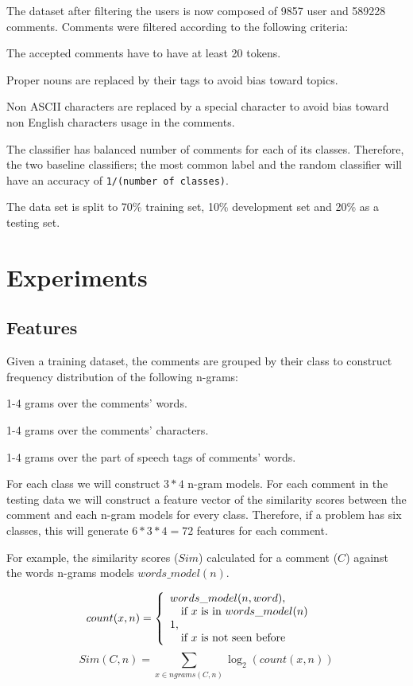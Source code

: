 \documentclass[10pt,a5paper,twoside]{article}
\begin{document}
The dataset after filtering the users is now composed of 9857 user and 589228
comments. Comments were filtered according to the following criteria:
\begin{compactitem}
\item The accepted comments have to have at least 20 tokens.
\item Proper nouns are replaced by their tags to avoid bias toward topics.
\item Non ASCII characters are replaced by a special character to avoid bias toward non English characters usage in the comments.
\item The classifier has balanced number of comments for each of its classes.
  Therefore, the two baseline classifiers; the most common label and the random
  classifier will have an accuracy of \verb+1/(number of classes)+.
\item The data set is split to 70\% training set, 10\% development set and 20\%
as a testing set.
\end{compactitem}

\section{Experiments}
\subsection{Features}
\label{features}
Given a training dataset, the comments are grouped by their class to construct
frequency distribution of the following n-grams:
\begin{compactitem}
\item 1-4 grams over the comments' words.
\item 1-4 grams over the comments' characters.
\item 1-4 grams over the part of speech tags of comments' words.
\end{compactitem}
For each class we will construct $3*4$ n-gram models. For each comment in the
testing data we will construct a feature vector of the similarity scores between
the comment and each n-gram models for every class. Therefore, if a problem has six
classes, this will generate $6*3*4 = 72$ features for each comment.

For example, the similarity scores ($Sim$) calculated for a comment ($C$)
against the words n-grams models $words\_model(n)$.

\[
  count(x, n) = \left\{
  \begin{array}{l l}
    words\_model(n, word), & \\\quad \text{if $x$ is in $words\_model(n)$}\\
    1,&\\\quad \text{if $x$ is not seen before}\\
  \end{array} \right.
\]
\[
  Sim(C, n) = \sum_{x \in ngrams(C,n)} \log_2 (count(x, n))
\]
\end{document}
